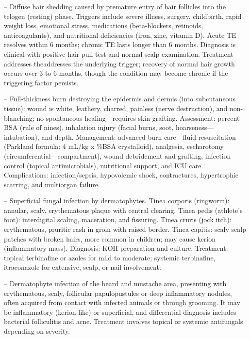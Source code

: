 -- Diffuse hair shedding caused by premature entry of hair follicles into the telogen (resting) phase. Triggers include severe illness, surgery, childbirth, rapid weight loss, emotional stress, medications (beta-blockers, retinoids, anticoagulants), and nutritional deficiencies (iron, zinc, vitamin D). Acute TE resolves within 6 months; chronic TE lasts longer than 6 months. Diagnosis is clinical with positive hair pull test and normal scalp examination. Treatment addresses theaddresses the underlying trigger; recovery of normal hair growth occurs over 3 to 6 months, though the condition may become chronic if the triggering factor persists.

-- Full-thickness burn destroying the epidermis and dermis (into subcutaneous tissue): wound is white, leathery, charred, painless (nerve destruction), and non-blanching; no spontaneous healing—requires skin grafting. Assessment: percent BSA (rule of nines), inhalation injury (facial burns, soot, hoarseness—intubation), and depth. Management: advanced burn care—fluid resuscitation (Parkland formula: 4 mL/kg x \%BSA crystalloid), analgesia, escharotomy (circumferential—compartment), wound debridement and grafting, infection control (topical antimicrobials), nutritional support, and ICU care. Complications: infection/sepsis, hypovolemic shock, contractures, hypertrophic scarring, and multiorgan failure.

-- Superficial fungal infection by dermatophytes. Tinea corporis (ringworm): annular, scaly, erythematous plaque with central clearing. Tinea pedis (athlete's foot): interdigital scaling, maceration, and fissuring. Tinea cruris (jock itch): erythematous, pruritic rash in groin with raised border. Tinea capitis: scaly scalp patches with broken hairs, more common in children; may cause kerion (inflammatory mass). Diagnosis: KOH preparation and culture. Treatment: topical terbinafine or azoles for mild to moderate; systemic terbinafine, itraconazole for extensive, scalp, or nail involvement.

-- Dermatophyte infection of the beard and mustache area, presenting with erythematous, scaly, follicular papulopustules or deep inflammatory nodules, often acquired from contact with infected animals or through grooming. It may be inflammatory (kerion-like) or superficial, and differential diagnosis includes bacterial folliculitis and acne. Treatment involves topical or systemic antifungals depending on severity.

